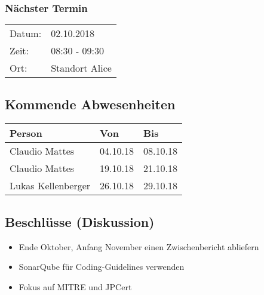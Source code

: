\subsubsection*{Nächster Termin}

\begin{tabular}{p{4cm} p{12cm}}
    Datum: & 02.10.2018 \\
    Zeit: & 08:30 - 09:30 \\
    Ort: & Standort Alice \\
\end{tabular}

\subsection*{Kommende Abwesenheiten}
\begin{table}[H]
    \centering
    \begin{tabular}{p{6cm} p{5cm} p{5cm}}
        \textbf{Person} & \textbf{Von} & \textbf{Bis} \\ \hline
        Claudio Mattes & 04.10.18 & 08.10.18 \\ \hline
        Claudio Mattes & 19.10.18 & 21.10.18 \\ \hline
        Lukas Kellenberger & 26.10.18 & 29.10.18 \\ \hline
    \end{tabular}
\end{table}

\subsection*{Beschlüsse (Diskussion)}
\begin{itemize}
    \item Ende Oktober, Anfang November einen Zwischenbericht abliefern
    \item SonarQube für Coding-Guidelines verwenden
    \item Fokus auf MITRE und JPCert
\end{itemize}

